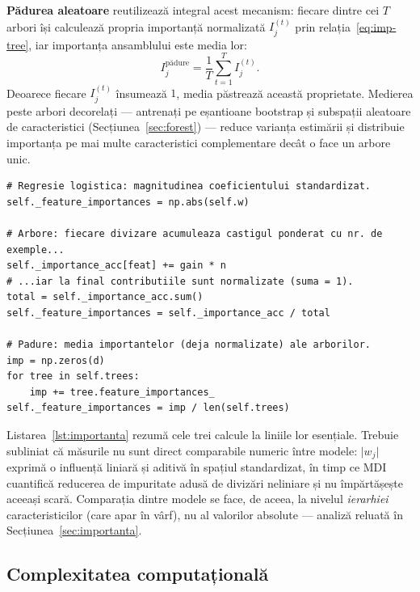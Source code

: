 \documentclass[12pt,a4paper]{report}
\begin{document}
\textbf{Pădurea aleatoare} reutilizează integral acest mecanism: fiecare dintre cei $T$ arbori își
calculează propria importanță normalizată $I_j^{(t)}$ prin relația~\eqref{eq:imp-tree}, iar importanța
ansamblului este media lor:
\begin{equation}
  I_j^{\text{pădure}} = \frac{1}{T} \sum_{t=1}^{T} I_j^{(t)} .
  \label{eq:imp-forest}
\end{equation}
Deoarece fiecare $I_j^{(t)}$ însumează $1$, media păstrează această proprietate. Medierea peste arbori
decorelați --- antrenați pe eșantioane bootstrap și subspații aleatoare de caracteristici
(Secțiunea~\ref{sec:forest}) --- reduce varianța estimării și distribuie importanța pe mai multe
caracteristici complementare decât o face un arbore unic.

\begin{lstlisting}[caption={Calculul importantei caracteristicilor pentru cele trei modele.}, label={lst:importanta}]
# Regresie logistica: magnitudinea coeficientului standardizat.
self._feature_importances = np.abs(self.w)

# Arbore: fiecare divizare acumuleaza castigul ponderat cu nr. de exemple...
self._importance_acc[feat] += gain * n
# ...iar la final contributiile sunt normalizate (suma = 1).
total = self._importance_acc.sum()
self._feature_importances = self._importance_acc / total

# Padure: media importantelor (deja normalizate) ale arborilor.
imp = np.zeros(d)
for tree in self.trees:
    imp += tree.feature_importances_
self._feature_importances = imp / len(self.trees)
\end{lstlisting}

Listarea~\ref{lst:importanta} rezumă cele trei calcule la liniile lor esențiale. Trebuie subliniat
că măsurile nu sunt direct comparabile numeric între modele: $\lvert w_j \rvert$ exprimă o influență
liniară și aditivă în spațiul standardizat, în timp ce MDI cuantifică reducerea de impuritate adusă
de divizări neliniare și nu împărtășește aceeași scară. Comparația dintre modele se face, de aceea,
la nivelul \emph{ierarhiei} caracteristicilor (care apar în vârf), nu al valorilor absolute ---
analiză reluată în Secțiunea~\ref{sec:importanta}.

\subsection{Complexitatea computațională}
\label{sec:complexitate}
\end{document}
